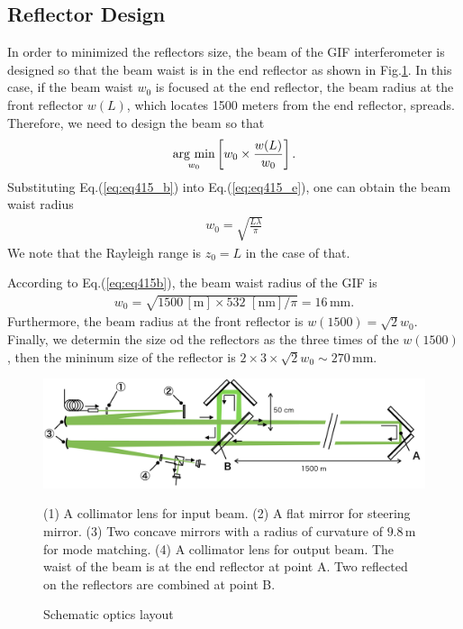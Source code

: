 \subsection{Reflector Design}
In order to minimized the reflectors size, the beam of the GIF interferometer is designed so that the beam waist is in the end reflector as shown in Fig.\ref{img:img416}. In this case, if the beam waist $w_0$ is focused at the end reflector, the beam radius at the front reflector $w(L)$, which locates 1500 meters from the end reflector, spreads. Therefore, we need to design the beam so that
\begin{eqnarray}
  \mathop{\rm arg~min}\limits_{w_0} \left[w_0\times\frac{w(L)}{w_0}\right]. \label{eq:eq415_e}
\end{eqnarray}
Substituting Eq.(\ref{eq:eq415_b}) into Eq.(\ref{eq:eq415_e}), one can obtain the beam waist radius
\begin{eqnarray}
  w_0 = \sqrt{\frac{{L\lambda}}{\pi}} \label{eq:eq415b}
\end{eqnarray}
We note that the Rayleigh range is $z_0 = L$ in the case of that.

According to Eq.(\ref{eq:eq415b}), the beam waist radius of the GIF is
\begin{eqnarray}
  w_0=\sqrt{{1500\,\mathrm{[m]}}\times 532\,\,\mathrm{[nm]}/\pi} = 16\,\mathrm{mm}.
\end{eqnarray}
Furthermore, the beam radius at the front reflector is $w(1500)=\sqrt{2}{w_0}$. Finally, we determin the size od the reflectors as the three times of the $w(1500)$, then the mininum size of the reflector is $2\times3\times\sqrt{2}w_0\sim270\,\mathrm{mm}$.

\begin{figure}[p]
  \begin{center}   
    \includegraphics[width=14cm]{./img_chap4/img416.png}
    \caption{Schematic optics layout}{(1) A collimator lens for input beam. (2) A flat mirror for steering mirror. (3) Two concave mirrors with a radius of curvature of $9.8\,\mathrm{m}$ for mode matching. (4) A collimator lens for output beam. The waist of the beam is at the end reflector at point A. Two reflected on the reflectors are combined at point B.}\label{img:img416}
  \end{center}
\end{figure}

